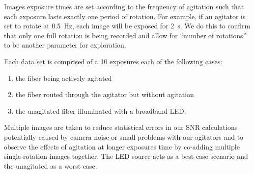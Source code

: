 \documentclass[twocolumn]{emulateapj}
\begin{document}
Images exposure times are set according to the frequency of agitation such that each exposure lasts exactly one period of rotation. For example, if an agitator is set to rotate at \SI{0.5}{\hertz}, each image will be exposed for \SI{2}{\second}. We do this to confirm that only one full rotation is being recorded and allow for ``number of rotations'' to be another parameter for exploration.


Each data set is comprised of a 10 exposures each of the following cases:
\begin{enumerate}
\item the fiber being actively agitated
\item the fiber routed through the agitator but without agitation
\item the unagitated fiber illuminated with a broadband LED.
\end{enumerate}
Multiple images are taken to reduce statistical errors in our SNR calculations potentially caused by camera noise or small problems with our agitators and to observe the effects of agitation at longer exposures time by co-adding multiple single-rotation images together. The LED source acts as a best-case scenario and the unagitated as a worst case.
\end{document}
